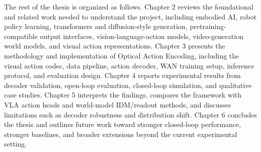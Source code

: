 
The rest of the thesis is organized as follows. Chapter 2 reviews the foundational and related work needed to understand the project, including embodied AI, robot policy learning, transformers and diffusion-style generation, pretraining-compatible output interfaces, vision-language-action models, video-generation world models, and visual action representations. Chapter 3 presents the methodology and implementation of Optical Action Encoding, including the visual action codec, data pipeline, action decoder, WAN training setup, inference protocol, and evaluation design. Chapter 4 reports experimental results from decoder validation, open-loop evaluation, closed-loop simulation, and qualitative case studies. Chapter 5 interprets the findings, compares the framework with VLA action heads and world-model IDM/readout methods, and discusses limitations such as decoder robustness and distribution shift. Chapter 6 concludes the thesis and outlines future work toward stronger closed-loop performance, stronger baselines, and broader extensions beyond the current experimental setting.
